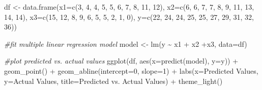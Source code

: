 \documentclass[
]{article}
\newenvironment{Shaded}{\begin{snugshade}}{\end{snugshade}}
\newcommand{\AttributeTok}[1]{\textcolor[rgb]{0.77,0.63,0.00}{#1}}
\newcommand{\CommentTok}[1]{\textcolor[rgb]{0.56,0.35,0.01}{\textit{#1}}}
\newcommand{\DecValTok}[1]{\textcolor[rgb]{0.00,0.00,0.81}{#1}}
\newcommand{\FunctionTok}[1]{\textcolor[rgb]{0.00,0.00,0.00}{#1}}
\newcommand{\NormalTok}[1]{#1}
\newcommand{\OtherTok}[1]{\textcolor[rgb]{0.56,0.35,0.01}{#1}}
\newcommand{\SpecialCharTok}[1]{\textcolor[rgb]{0.00,0.00,0.00}{#1}}
\newcommand{\StringTok}[1]{\textcolor[rgb]{0.31,0.60,0.02}{#1}}
\begin{document}
\begin{Shaded}
\begin{Highlighting}[]
\NormalTok{df }\OtherTok{\textless{}{-}} \FunctionTok{data.frame}\NormalTok{(}\AttributeTok{x1=}\FunctionTok{c}\NormalTok{(}\DecValTok{3}\NormalTok{, }\DecValTok{4}\NormalTok{, }\DecValTok{4}\NormalTok{, }\DecValTok{5}\NormalTok{, }\DecValTok{5}\NormalTok{, }\DecValTok{6}\NormalTok{, }\DecValTok{7}\NormalTok{, }\DecValTok{8}\NormalTok{, }\DecValTok{11}\NormalTok{, }\DecValTok{12}\NormalTok{),}
                 \AttributeTok{x2=}\FunctionTok{c}\NormalTok{(}\DecValTok{6}\NormalTok{, }\DecValTok{6}\NormalTok{, }\DecValTok{7}\NormalTok{, }\DecValTok{7}\NormalTok{, }\DecValTok{8}\NormalTok{, }\DecValTok{9}\NormalTok{, }\DecValTok{11}\NormalTok{, }\DecValTok{13}\NormalTok{, }\DecValTok{14}\NormalTok{, }\DecValTok{14}\NormalTok{),}
                 \AttributeTok{x3=}\FunctionTok{c}\NormalTok{(}\DecValTok{15}\NormalTok{, }\DecValTok{12}\NormalTok{, }\DecValTok{8}\NormalTok{, }\DecValTok{9}\NormalTok{, }\DecValTok{6}\NormalTok{, }\DecValTok{5}\NormalTok{, }\DecValTok{5}\NormalTok{, }\DecValTok{2}\NormalTok{, }\DecValTok{1}\NormalTok{, }\DecValTok{0}\NormalTok{),}
                 \AttributeTok{y=}\FunctionTok{c}\NormalTok{(}\DecValTok{22}\NormalTok{, }\DecValTok{24}\NormalTok{, }\DecValTok{24}\NormalTok{, }\DecValTok{25}\NormalTok{, }\DecValTok{25}\NormalTok{, }\DecValTok{27}\NormalTok{, }\DecValTok{29}\NormalTok{, }\DecValTok{31}\NormalTok{, }\DecValTok{32}\NormalTok{, }\DecValTok{36}\NormalTok{))}

\CommentTok{\#fit multiple linear regression model}
\NormalTok{model }\OtherTok{\textless{}{-}} \FunctionTok{lm}\NormalTok{(y }\SpecialCharTok{\textasciitilde{}}\NormalTok{ x1 }\SpecialCharTok{+}\NormalTok{ x2 }\SpecialCharTok{+}\NormalTok{x3, }\AttributeTok{data=}\NormalTok{df)}

\CommentTok{\#plot predicted vs. actual values}
\FunctionTok{ggplot}\NormalTok{(df, }\FunctionTok{aes}\NormalTok{(}\AttributeTok{x=}\FunctionTok{predict}\NormalTok{(model), }\AttributeTok{y=}\NormalTok{y)) }\SpecialCharTok{+} 
  \FunctionTok{geom\_point}\NormalTok{() }\SpecialCharTok{+}
  \FunctionTok{geom\_abline}\NormalTok{(}\AttributeTok{intercept=}\DecValTok{0}\NormalTok{, }\AttributeTok{slope=}\DecValTok{1}\NormalTok{) }\SpecialCharTok{+}
  \FunctionTok{labs}\NormalTok{(}\AttributeTok{x=}\StringTok{\textquotesingle{}Predicted Values\textquotesingle{}}\NormalTok{, }\AttributeTok{y=}\StringTok{\textquotesingle{}Actual Values\textquotesingle{}}\NormalTok{, }
       \AttributeTok{title=}\StringTok{\textquotesingle{}Predicted vs. Actual Values\textquotesingle{}}\NormalTok{) }\SpecialCharTok{+}
  \FunctionTok{theme\_light}\NormalTok{()}
\end{Highlighting}
\end{Shaded}
\end{document}
